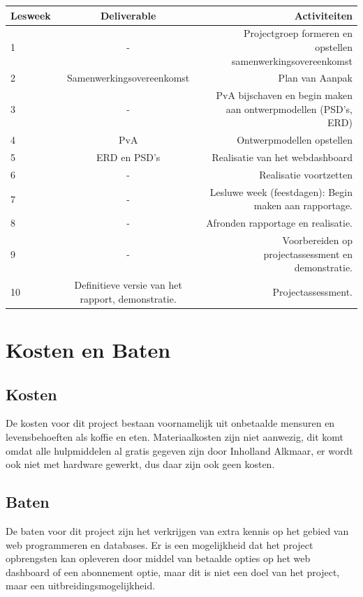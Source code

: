 \documentclass[11pt]{article}
\begin{document}
\begin{adjustbox}{width=\textwidth}
	\begin{tabular}{|l | c | r |}
		\hline
		Lesweek & Deliverable & Activiteiten \\ \hline
		1 & -	& Projectgroep formeren en opstellen samenwerkingsovereenkomst \\ \hline
		2 & Samenwerkingsovereenkomst & Plan van Aanpak\\ \hline
		3 & - & PvA bijschaven en begin maken aan ontwerpmodellen
		(PSD’s, ERD)\\ \hline
		4 & PvA & Ontwerpmodellen opstellen\\ \hline
		5 & ERD en PSD's & Realisatie van het webdashboard\\ \hline
		6 & - & Realisatie voortzetten\\ \hline
		7 & - & Lesluwe week (feestdagen): Begin maken aan rapportage.\\ \hline
		8 & - & Afronden rapportage en realisatie.\\ \hline
		9 & - & Voorbereiden op projectassessment en demonstratie.\\ \hline
		10 & Definitieve versie van	het rapport, demonstratie.&
		Projectassessment.\\ \hline
		
	\end{tabular}
\end{adjustbox}
\newline
\newline

\section{Kosten en Baten}
\subsection{Kosten}
De kosten voor dit project bestaan voornamelijk uit onbetaalde mensuren en levensbehoeften als koffie en eten. Materiaalkosten zijn niet aanwezig, dit komt omdat alle hulpmiddelen al gratis gegeven zijn door Inholland Alkmaar, er wordt ook niet met hardware gewerkt, dus daar zijn ook geen kosten.
\subsection{Baten}
De baten voor dit project zijn het verkrijgen van extra kennis op het gebied van web programmeren en databases. Er is een mogelijkheid dat het project opbrengsten kan opleveren door middel van betaalde opties op het web dashboard of een abonnement optie, maar dit is niet een doel van het project, maar een uitbreidingsmogelijkheid.
\newpage
\end{document}
